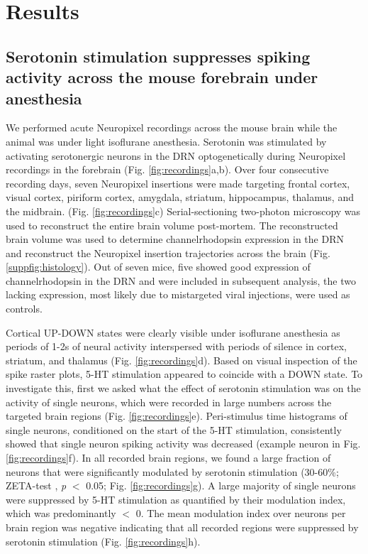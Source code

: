 \documentclass[11pt,a4paper,onecolumn]{article}
\begin{document}
\section*{Results}
\vspace{-8pt}
\subsection*{Serotonin stimulation suppresses spiking activity across the mouse forebrain under anesthesia}
We performed acute Neuropixel recordings across the mouse brain while the animal was under light isoflurane anesthesia. Serotonin was stimulated by activating serotonergic neurons in the DRN optogenetically during Neuropixel recordings in the forebrain (Fig. \ref{fig:recordings}a,b). Over four consecutive recording days, seven Neuropixel insertions were made targeting frontal cortex, visual cortex, piriform cortex, amygdala, striatum, hippocampus, thalamus, and the midbrain. (Fig. \ref{fig:recordings}c) Serial-sectioning two-photon microscopy was used to reconstruct the entire brain volume post-mortem. The reconstructed brain volume was used to determine channelrhodopsin expression in the DRN and reconstruct the Neuropixel insertion trajectories across the brain (Fig. \ref{suppfig:histology}). Out of seven mice, five showed good expression of channelrhodopsin in the DRN and were included in subsequent analysis, the two lacking expression, most likely due to mistargeted viral injections, were used as controls.

Cortical UP-DOWN states were clearly visible under isoflurane anesthesia as periods of 1-2s of neural activity interspersed with periods of silence in cortex, striatum, and thalamus (Fig. \ref{fig:recordings}d). Based on visual inspection of the spike raster plots, 5-HT stimulation appeared to coincide with a DOWN state. To investigate this, first we asked what the effect of serotonin stimulation was on the activity of single neurons, which were recorded in large numbers across the targeted brain regions (Fig. \ref{fig:recordings}e). Peri-stimulus time histograms of single neurons, conditioned on the start of the 5-HT stimulation, consistently showed that single neuron spiking activity was decreased (example neuron in Fig. \ref{fig:recordings}f). In all recorded brain regions, we found a large fraction of neurons that were significantly modulated by serotonin stimulation (30-60\%; ZETA-test \citep{montijn_parameter-free_2021}, \emph{p} $<$ 0.05; Fig. \ref{fig:recordings}g). A large majority of single neurons were suppressed by 5-HT stimulation as quantified by their modulation index, which was predominantly $<$ 0. The mean modulation index over neurons per brain region was negative indicating that all recorded regions were suppressed by serotonin stimulation (Fig. \ref{fig:recordings}h).
\end{document}

